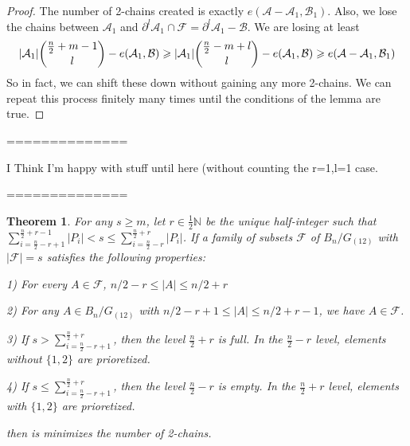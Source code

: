 \documentclass[12pt]{article}
\theoremstyle{plain}
\newtheorem{theorem}{Theorem}
\theoremstyle{definition}
\theoremstyle{remark}
\newcommand{\F}{\mathcal{F}}
\newcommand{\A}{\mathcal{A}}
\newcommand{\B}{\mathcal{B}}
\begin{document}
\begin{proof}
The number of 2-chains created is exactly $e(\A - \A_1, \B_1)$. Also, we lose the chains between $\A_1$ and $\partial^l\A_1 \cap \F = \partial^l\A_1 - \B$. We are losing at least
\[ |\A_1|\dbinom{\frac{n}{2}+m-1}{l} - e(\A_1, \B) \geq |\A_1|\dbinom{\frac{n}{2} - m + l}{l} - e(\A_1, \B) \geq e(\A - \A_1, \B_1) \] 
So in fact, we can shift these down without gaining any more 2-chains. We can repeat this process finitely many times until the conditions of the lemma are true.
\end{proof}

==============

I Think I'm happy with stuff until here (without counting the r=1,l=1 case.

==============

\begin{theorem} For any $s \geq m$, let $r \in \frac{1}{2}\mathbb{N}$ be the unique half-integer such that $\sum_{i = \frac{n}{2} - r +1}^{\frac{n}{2} + r -1} |P_i| < s \leq \sum_{i = \frac{n}{2}-r}^{\frac{n}{2}+r}|P_i|$. If a family of subsets $\F$ of $B_n / G_{(12)}$ with $|\F| = s$ satisfies the following properties:

1) For every $A \in \F$, $n/2 - r \leq |A| \leq n/2 + r$

2) For any $A \in B_n / G_{(12)}$ with $n/2 - r + 1 \leq |A| \leq n/2 + r - 1$, we have $A \in \F$.

3) If $s > \sum_{i=\frac{n}{2}-r+1}^{\frac{n}{2}+r}$, then the level $\frac{n}{2}+r$ is full. In the $\frac{n}{2}-r$ level, elements without $\{1, 2\}$ are prioretized.

4) If $s \leq \sum_{i=\frac{n}{2}-r+1}^{\frac{n}{2}+r}$, then the level $\frac{n}{2}-r$ is empty. In the $\frac{n}{2} + r$ level, elements with $\{1, 2\}$ are prioretized.

then is minimizes the number of 2-chains.
\end{theorem}
\end{document}
